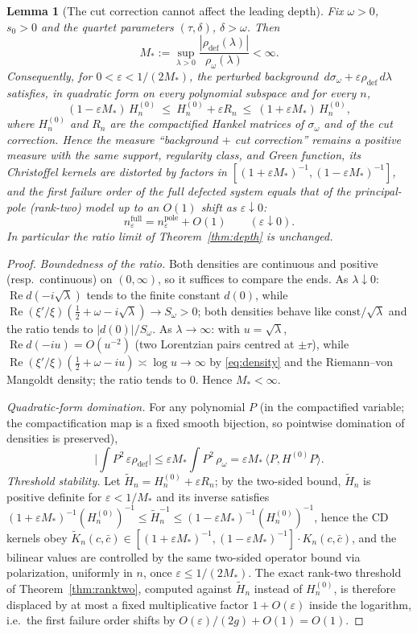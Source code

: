 \documentclass[11pt]{amsart}
\newtheorem{lemma}[theorem]{Lemma}
\theoremstyle{definition}
\theoremstyle{remark}
\newcommand{\dd}{\,d}
\newcommand{\eps}{\varepsilon}
\DeclareMathOperator{\Rea}{Re}
\begin{document}
\begin{lemma}[The cut correction cannot affect the leading depth]
\label{lem:cut}
Fix $\omega>0$, $s_0>0$ and the quartet parameters $(\tau,\delta)$,
$\delta>\omega$. Then
\[
M_*:=\sup_{\lambda>0}
\frac{|\rho_{\mathrm{def}}(\lambda)|}{\rho_\omega(\lambda)}<\infty .
\]
Consequently, for $0<\eps<1/(2M_*)$, the perturbed background
$\dd\sigma_\omega+\eps\rho_{\mathrm{def}}\dd\lambda$ satisfies, in quadratic
form on every polynomial subspace and for every $n$,
\[
(1-\eps M_*)\,H_n^{(0)}\ \le\ H_n^{(0)}+\eps R_n\ \le\ (1+\eps M_*)\,H_n^{(0)},
\]
where $H_n^{(0)}$ and $R_n$ are the compactified Hankel matrices of
$\sigma_\omega$ and of the cut correction. Hence the measure
``background $+$ cut correction'' remains a positive measure with the same
support, regularity class, and Green function, its Christoffel kernels are
distorted by factors in $[(1+\eps M_*)^{-1},(1-\eps M_*)^{-1}]$, and the
first failure order of the full defected system equals that of the
principal-pole (rank-two) model up to an $O(1)$ shift as $\eps\downarrow0$:
\[
n^{\mathrm{full}}_\eps=n^{\mathrm{pole}}_\eps+O(1)
\qquad(\eps\downarrow0).
\]
In particular the ratio limit of Theorem~\ref{thm:depth} is unchanged.
\end{lemma}

\begin{proof}
\emph{Boundedness of the ratio.} Both densities are continuous and positive
(resp.\ continuous) on $(0,\infty)$, so it suffices to compare the ends. As
$\lambda\downarrow0$: $\Rea d(-i\sqrt\lambda)$ tends to the finite constant
$d(0)$, while $\Rea(\xi'/\xi)(\tfrac12+\omega-i\sqrt\lambda)\to S_\omega>0$;
both densities behave like $\text{const}/\sqrt\lambda$ and the ratio tends to
$|d(0)|/S_\omega$. As $\lambda\to\infty$: with $u=\sqrt\lambda$,
$\Rea d(-iu)=O(u^{-2})$ (two Lorentzian pairs centred at $\pm\tau$), while
$\Rea(\xi'/\xi)(\tfrac12+\omega-iu)\asymp\log u\to\infty$ by
\eqref{eq:density} and the Riemann--von Mangoldt density; the ratio tends to
$0$. Hence $M_*<\infty$.

\emph{Quadratic-form domination.} For any polynomial $P$ (in the
compactified variable; the compactification map is a fixed smooth bijection,
so pointwise domination of densities is preserved),
\[
\Big|\int P^2\,\eps\rho_{\mathrm{def}}\Big|
\le\eps M_*\int P^2\,\rho_\omega
=\eps M_*\,\langle P,H^{(0)}P\rangle .
\]
\emph{Threshold stability.} Let $\widetilde H_n=H^{(0)}_n+\eps R_n$; by the
two-sided bound, $\widetilde H_n$ is positive definite for
$\eps<1/M_*$ and its inverse satisfies
$(1+\eps M_*)^{-1}(H^{(0)}_n)^{-1}\le\widetilde H_n^{-1}\le
(1-\eps M_*)^{-1}(H^{(0)}_n)^{-1}$, hence the CD kernels obey
$\widetilde K_n(c,\bar c)\in
[(1+\eps M_*)^{-1},(1-\eps M_*)^{-1}]\cdot K_n(c,\bar c)$,
and the bilinear values are controlled by the same two-sided operator bound
via polarization, uniformly in $n$, once $\eps\le 1/(2M_*)$. The exact
rank-two threshold of Theorem~\ref{thm:ranktwo}, computed against
$\widetilde H_n$ instead of $H^{(0)}_n$, is therefore displaced by at most a
fixed multiplicative factor $1+O(\eps)$ inside the logarithm, i.e.\ the first
failure order shifts by $O(\eps)/(2g)+O(1)=O(1)$.
\end{proof}
\end{document}
